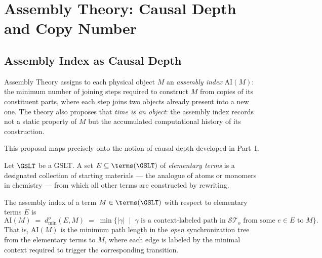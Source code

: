 \chapter{Assembly Theory: Causal Depth and Copy Number}
\label{sec:assembly}

\section{Assembly Index as Causal Depth}

Assembly Theory assigns to each physical object $M$ an
\emph{assembly index} $\mathrm{AI}(M)$: the minimum number of
joining steps required to construct $M$ from copies of its
constituent parts, where each step joins two objects already
present into a new one.
The theory also proposes that \emph{time is an object}: the
assembly index records not a static property of $M$ but the
accumulated computational history of its construction.

This proposal maps precisely onto the notion of causal depth
developed in Part~I.

\begin{definition}
Let $\GSLT$ be a GSLT.
A set $E \subseteq \terms(\GSLT)$ of \emph{elementary terms}
is a designated collection of starting materials --- the analogue
of atoms or monomers in chemistry --- from which all other terms
are constructed by rewriting.
\end{definition}

\begin{proposition}
\label{prop:assembly-index}
The assembly index of a term $M \in \terms(\GSLT)$ with respect
to elementary terms $E$ is
\[
  \mathrm{AI}(M) \;=\; d^o_{\min}(E, M)
  \;=\; \min\bigl\{ |\gamma| \;\mid\;
    \gamma \text{ is a context-labeled path in } \mathcal{ST}_o
    \text{ from some } e \in E \text{ to } M
  \bigr\}.
\]
That is, $\mathrm{AI}(M)$ is the minimum path length in the
\emph{open} synchronization tree from the elementary terms to $M$,
where each edge is labeled by the minimal context required to
trigger the corresponding transition.
\end{proposition}

